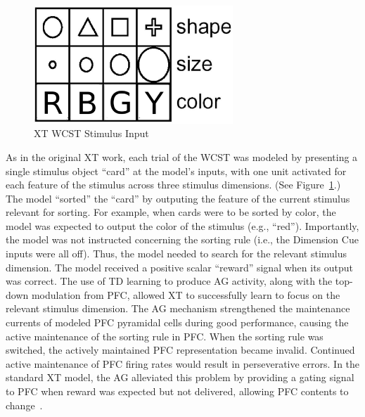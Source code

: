 \begin{figure}
  \begin{center}
  \includegraphics[width=75mm]{figures/xt_wcst_stim}
  \end{center}
  \caption{XT WCST Stimulus Input}
  \label{xt_wcst_stim}
\end{figure}

As in the original XT work, each trial of the WCST was modeled by presenting a single stimulus object ``card'' at the model's inputs, with one unit activated for each feature of the stimulus across three stimulus dimensions. (See Figure~\ref{xt_wcst_stim}.) The model ``sorted'' the ``card'' by outputing the feature of the current stimulus relevant for sorting. For example, when cards were to be sorted by color, the model was expected to output the color of the stimulus (e.g., ``red''). Importantly, the model was not instructed concerning the sorting rule (i.e., the Dimension Cue inputs were all off). Thus, the model needed to search for the relevant stimulus dimension. The model received a positive scalar ``reward'' signal when its output was correct. The use of TD learning to produce AG activity, along with the top-down modulation from PFC, allowed XT to successfully learn to focus on the relevant stimulus dimension. The AG mechanism strengthened the maintenance currents of modeled PFC pyramidal cells during good performance, causing the active maintenance of the sorting rule in PFC. When the sorting rule was switched, the actively maintained PFC representation became invalid. Continued active maintenance of PFC firing rates would result in perseverative errors. In the standard XT model, the AG alleviated this problem by providing a gating signal to PFC when reward was expected but not delivered, allowing PFC contents to change~\cite{RougierNP:2005:XT}.


%
%
%

